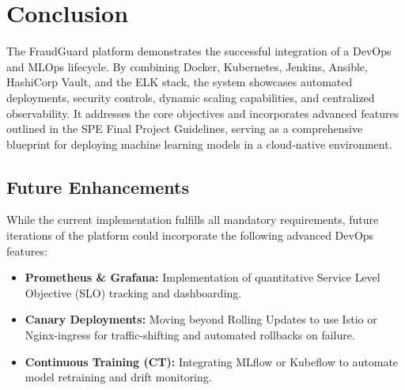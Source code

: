 \documentclass[12pt,a4paper]{article}
\begin{document}
\section{Conclusion}
The FraudGuard platform demonstrates the successful integration of a DevOps and MLOps lifecycle. By combining Docker, Kubernetes, Jenkins, Ansible, HashiCorp Vault, and the ELK stack, the system showcases automated deployments, security controls, dynamic scaling capabilities, and centralized observability. It addresses the core objectives and incorporates advanced features outlined in the SPE Final Project Guidelines, serving as a comprehensive blueprint for deploying machine learning models in a cloud-native environment.

\subsection{Future Enhancements}
While the current implementation fulfills all mandatory requirements, future iterations of the platform could incorporate the following advanced DevOps features:
\begin{itemize}
    \item \textbf{Prometheus \& Grafana:} Implementation of quantitative Service Level Objective (SLO) tracking and dashboarding.
    \item \textbf{Canary Deployments:} Moving beyond Rolling Updates to use Istio or Nginx-ingress for traffic-shifting and automated rollbacks on failure.
    \item \textbf{Continuous Training (CT):} Integrating MLflow or Kubeflow to automate model retraining and drift monitoring.
\end{itemize}
\end{document}
